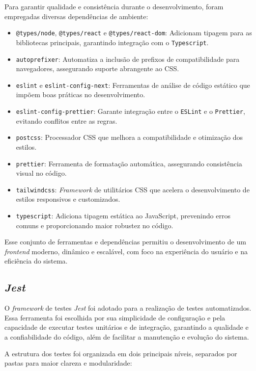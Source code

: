 Para garantir qualidade e consistência durante o desenvolvimento, foram empregadas diversas dependências de ambiente:

\begin{itemize} 
  \item \texttt{@types/node}, \texttt{@types/react} e \texttt{@types/react-dom}: Adicionam tipagem para as bibliotecas principais, garantindo integração com o \texttt{Typescript}. 
  \item \texttt{autoprefixer}: Automatiza a inclusão de prefixos de compatibilidade para navegadores, assegurando suporte abrangente ao CSS. 
  \item \texttt{eslint} e \texttt{eslint-config-next}: Ferramentas de análise de código estático que impõem boas práticas no desenvolvimento. 
  \item \texttt{eslint-config-prettier}: Garante integração entre o \texttt{ESLint} e o \texttt{Prettier}, evitando conflitos entre as regras. 
  \item \texttt{postcss}: Processador CSS que melhora a compatibilidade e otimização dos estilos. 
  \item \texttt{prettier}: Ferramenta de formatação automática, assegurando consistência visual no código. 
  \item \texttt{tailwindcss}: \textit{Framework} de utilitários CSS que acelera o desenvolvimento de estilos responsivos e customizados. 
  \item \texttt{typescript}: Adiciona tipagem estática ao JavaScript, prevenindo erros comuns e proporcionando maior robustez no código. \end{itemize}

Esse conjunto de ferramentas e dependências permitiu o desenvolvimento de um \textit{frontend} moderno, dinâmico e escalável, com foco na experiência do usuário e na eficiência do sistema.

\subsection{\textit{Jest}}
O \textit{framework} de testes \textit{Jest} foi adotado para a realização de testes automatizados. Essa ferramenta foi escolhida por sua simplicidade de configuração e pela capacidade de executar testes unitários e de integração, garantindo a qualidade e a confiabilidade do código, além de facilitar a manutenção e evolução do sistema.

A estrutura dos testes foi organizada em dois principais níveis, separados por pastas para maior clareza e modularidade:

